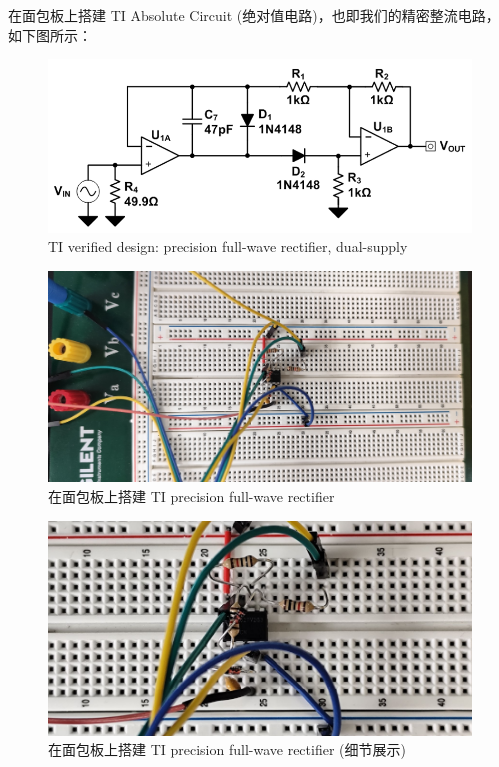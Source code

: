 \documentclass[UTF8]{article}
\begin{document}
在面包板上搭建 TI Absolute Circuit (绝对值电路)，也即我们的精密整流电路，如下图所示：

\begin{figure}[H]\centering
    \includegraphics[width=0.7\columnwidth]{LCE-05-精密整流/assets/TI absolute.png}
    \caption{TI verified design: precision full-wave rectifier, dual-supply}
    \label{TI Verified Design: Precision Full-Wave Rectifier, Dual-Supply}
\end{figure}

\begin{figure}[H]\centering
    \includegraphics[width=\columnwidth]{LCE-05-精密整流/assets/1N4148/circuit.png}
    \caption{在面包板上搭建 TI precision full-wave rectifier}
\end{figure}

\begin{figure}[H]\centering
    \includegraphics[width=\columnwidth]{LCE-05-精密整流/assets/1N4148/circuit 2.png}
    \caption{在面包板上搭建 TI precision full-wave rectifier (细节展示)}
\end{figure}
\end{document}
